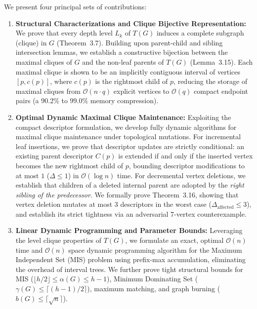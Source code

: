 We present four principal sets of contributions:
\begin{enumerate}[label=\textbf{(\arabic*)}]
    \item \textbf{Structural Characterizations and Clique Bijective Representation:}
    We prove that every depth level $L_k$ of $T(G)$ induces a complete subgraph (clique) in $G$ (Theorem~3.7). Building upon parent-child and sibling intersection lemmas, we establish a constructive bijection between the maximal cliques of $G$ and the non-leaf parents of $T(G)$ (Lemma~3.15). Each maximal clique is shown to be an implicitly contiguous interval of vertices $[p, c(p)]$, where $c(p)$ is the rightmost child of $p$, reducing the storage of maximal cliques from $\mathcal{O}(n \cdot q)$ explicit vertices to $\mathcal{O}(q)$ compact endpoint pairs (a $90.2\%$ to $99.0\%$ memory compression).

    \item \textbf{Optimal Dynamic Maximal Clique Maintenance:}
    Exploiting the compact descriptor formulation, we develop fully dynamic algorithms for maximal clique maintenance under topological mutations. For incremental leaf insertions, we prove that descriptor updates are strictly conditional: an existing parent descriptor $C(p)$ is extended if and only if the inserted vertex becomes the new rightmost child of $p$, bounding descriptor modifications to at most $1$ ($\Delta \le 1$) in $\mathcal{O}(\log n)$ time. For decremental vertex deletions, we establish that children of a deleted internal parent are adopted by the \emph{right sibling of the predecessor}. We formally prove Theorem~3.16, showing that vertex deletion mutates at most $3$ descriptors in the worst case ($\Delta_{\text{affected}} \le 3$), and establish its strict tightness via an adversarial 7-vertex counterexample.

    \item \textbf{Linear Dynamic Programming and Parameter Bounds:}
    Leveraging the level clique properties of $T(G)$, we formulate an exact, optimal $\mathcal{O}(n)$ time and $\mathcal{O}(n)$ space dynamic programming algorithm for the Maximum Independent Set (MIS) problem using prefix-max accumulation, eliminating the overhead of interval trees. We further prove tight structural bounds for MIS ($\lfloor h/2 \rfloor \le \alpha(G) \le h-1$), Minimum Dominating Set ($\gamma(G) \le \lceil (h-1)/2 \rceil$), maximum matching, and graph burning ($b(G) \le \lceil \sqrt{n} \rceil$).


\end{enumerate}
